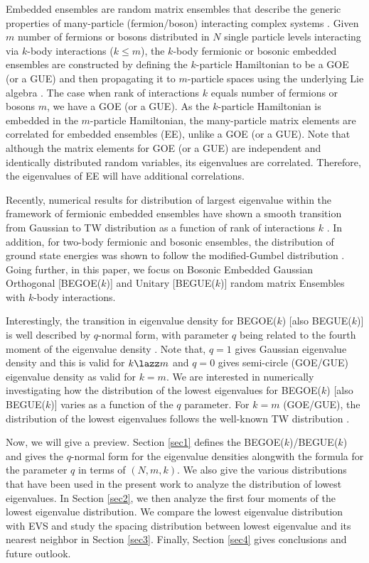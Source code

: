 Embedded ensembles are random matrix ensembles that describe the generic properties of many-particle (fermion/boson) interacting complex systems \cite{vkbk}.  Given $m$ number of fermions or bosons distributed in $N$ single particle levels interacting via $k$-body interactions ($k \leq m$),  the $k$-body fermionic or bosonic embedded ensembles are constructed by defining the $k$-particle Hamiltonian to be a GOE (or a GUE) and then propagating it to $m$-particle spaces using the underlying Lie algebra \cite{vkbk}.  The case when rank of interactions $k$ equals number of fermions or bosons $m$, we have a GOE (or a GUE). As the $k$-particle Hamiltonian is embedded in the $m$-particle Hamiltonian, the many-particle matrix elements are correlated for embedded ensembles (EE), unlike a GOE (or a GUE).  Note that although the matrix elements for GOE (or a GUE) are independent and identically distributed random variables, its eigenvalues are correlated. Therefore, the eigenvalues of EE will have additional correlations.

Recently, numerical results for distribution of largest eigenvalue within the framework of fermionic embedded ensembles have shown a smooth transition from Gaussian to TW distribution as a function of rank of interactions $k$ \cite{Be-23}.  In addition, for two-body fermionic and bosonic ensembles, the distribution of ground state energies was shown to follow the modified-Gumbel distribution \cite{IJMPE-2018}.  Going further,  in this paper, we focus on Bosonic Embedded Gaussian Orthogonal [BEGOE($k$)] and Unitary [BEGUE($k$)] random matrix Ensembles with $k$-body interactions. 

Interestingly, the transition in eigenvalue density for BEGOE($k$) [also BEGUE($k$)] is well described by $q$-normal form, with parameter $q$ being related to the fourth moment of the eigenvalue density  \cite{JSM-2019}.  Note that, $q =1$ gives Gaussian  eigenvalue density and this is valid for $k \lazz m$ and $q = 0$ gives semi-circle (GOE/GUE) eigenvalue density as valid for $k = m$.  We are interested in numerically investigating how the distribution of the lowest eigenvalues for BEGOE($k$) [also BEGUE($k$)] varies as a function of the $q$ parameter.  For $k = m$ (GOE/GUE), the distribution of the lowest eigenvalues follows the well-known TW distribution \cite{TW-1, TW-2, TW-3}.  

Now, we will give a preview.  Section \ref{sec1} defines the BEGOE($k$)/BEGUE($k$) and gives the $q$-normal form for the eigenvalue densities alongwith the formula for the parameter $q$ in terms of $(N,m,k)$.  We also give the various distributions that have been used in the present work to analyze the distribution of lowest eigenvalues.  In Section \ref{sec2}, we then analyze the first four moments of the lowest eigenvalue distribution.  We compare the lowest eigenvalue distribution with EVS and study the spacing distribution between lowest eigenvalue and its nearest neighbor in Section \ref{sec3}.  Finally, Section \ref{sec4} gives conclusions and future outlook.

